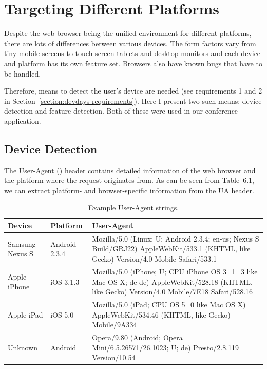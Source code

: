 \section{Targeting Different Platforms}
\label{section:targeting-platforms}

Despite the web browser being the unified environment for different
platforms, there are lots of differences between various devices. The
form factors vary from tiny mobile screens to touch screen tablets and
desktop monitors and each device and platform has its own feature
set. Browsers also have known bugs that have to be handled.

Therefore, means to detect the user's device are needed (see
requirements 1 and 2 in
Section~\ref{section:devdays-requirements}). Here I present two such
means: device detection and feature detection. Both of these were used
in our conference application.

\subsection{Device Detection}
\label{subsection:device-detection}

The User-Agent ()  header contains detailed
information of the web browser and the platform where the request
originates from. As can be seen from Table~6.1\tableref, we can
extract platform- and browser-specific information from the UA header.

\begin{table}
  \begin{tabular}{ l | l | p{7cm} }
    \textbf{Device} & \textbf{Platform} & \textbf{User-Agent} \\ \hline
    Samsung Nexus S & Android 2.3.4 & Mozilla/5.0 (Linux; U; Android 2.3.4; en-us; Nexus S Build/GRJ22) AppleWebKit/533.1 (KHTML, like Gecko) Version/4.0 Mobile Safari/533.1 \\ \hline
    Apple iPhone & iOS 3.1.3 & Mozilla/5.0 (iPhone; U; CPU iPhone OS 3\_1\_3 like Mac OS X; de-de) AppleWebKit/528.18 (KHTML, like Gecko) Version/4.0 Mobile/7E18 Safari/528.16 \\ \hline
    Apple iPad & iOS 5.0 & Mozilla/5.0 (iPad; CPU OS 5\_0 like Mac OS X) AppleWebKit/534.46 (KHTML, like Gecko) Mobile/9A334 \\ \hline
    Unknown & Android & Opera/9.80 (Android; Opera Mini/6.5.26571/26.1023; U; de) Presto/2.8.119 Version/10.54 \\ \hline
  \end{tabular}
  \label{table:user-agents}
  \caption{Example User-Agent strings.}
\end{table}

